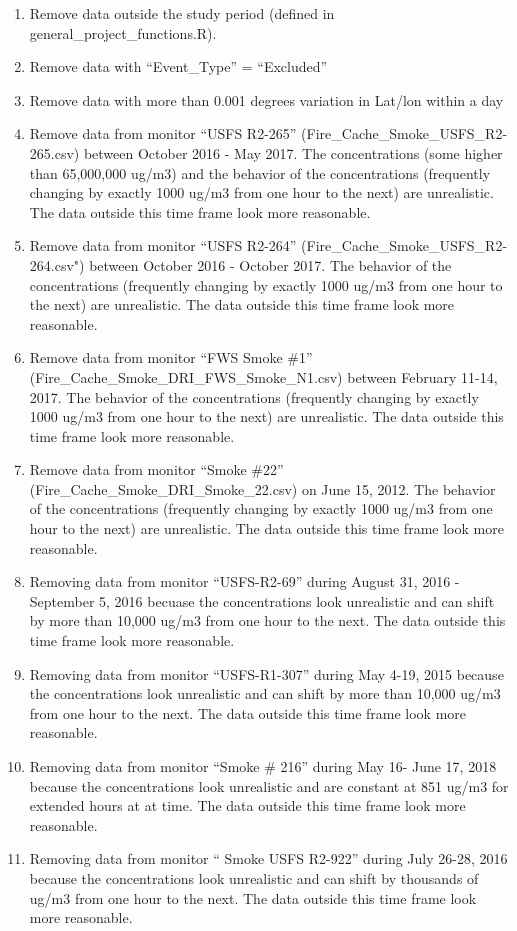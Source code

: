 \begin{enumerate}[nolistsep]
\begin{enumerate}[nolistsep]
	\item Remove data outside the study period (defined in general\_project\_functions.R).
	\item Remove data with ``Event\_Type'' = ``Excluded''
	\item Remove data with more than 0.001 degrees variation in Lat/lon within a day
	\item Remove data from monitor ``USFS R2-265'' (Fire\_Cache\_Smoke\_USFS\_R2-265.csv) between October 2016 - May 2017. The concentrations (some higher than 65,000,000 ug/m3) and the behavior of the concentrations (frequently changing by exactly 1000 ug/m3 from one hour to the next) are unrealistic. The data outside this time frame look more reasonable.
	\item Remove data from monitor ``USFS R2-264'' (Fire\_Cache\_Smoke\_USFS\_R2-264.csv") between October 2016 - October 2017. The behavior of the concentrations (frequently changing by exactly 1000 ug/m3 from one hour to the next) are unrealistic. The data outside this time frame look more reasonable.
	\item Remove data from monitor ``FWS Smoke \#1'' (Fire\_Cache\_Smoke\_DRI\_FWS\_Smoke\_N1.csv) between February 11-14, 2017. The behavior of the concentrations (frequently changing by exactly 1000 ug/m3 from one hour to the next) are unrealistic. The data outside this time frame look more reasonable.
	\item Remove data from monitor ``Smoke \#22'' (Fire\_Cache\_Smoke\_DRI\_Smoke\_22.csv) on June 15, 2012. The behavior of the concentrations (frequently changing by exactly 1000 ug/m3 from one hour to the next) are unrealistic. The data outside this time frame look more reasonable.
	\item Removing data from monitor ``USFS-R2-69'' during August 31, 2016 - September 5, 2016 becuase the concentrations look unrealistic and can shift by more than 10,000 ug/m3 from one hour to the next. The data outside this time frame look more reasonable.
	\item Removing data from monitor ``USFS-R1-307'' during May 4-19, 2015 because the concentrations look unrealistic and can shift by more than 10,000 ug/m3 from one hour to the next. The data outside this time frame look more reasonable.
	\item Removing data from monitor ``Smoke \# 216'' during May 16- June 17, 2018 because the concentrations look unrealistic and are constant at 851 ug/m3 for extended hours at at time. The data outside this time frame look more reasonable.
	\item Removing data from monitor `` Smoke USFS R2-922'' during July 26-28, 2016 because the concentrations look unrealistic and can shift by thousands of ug/m3 from one hour to the next. The data outside this time frame look more reasonable.


\end{enumerate}
\end{enumerate}
